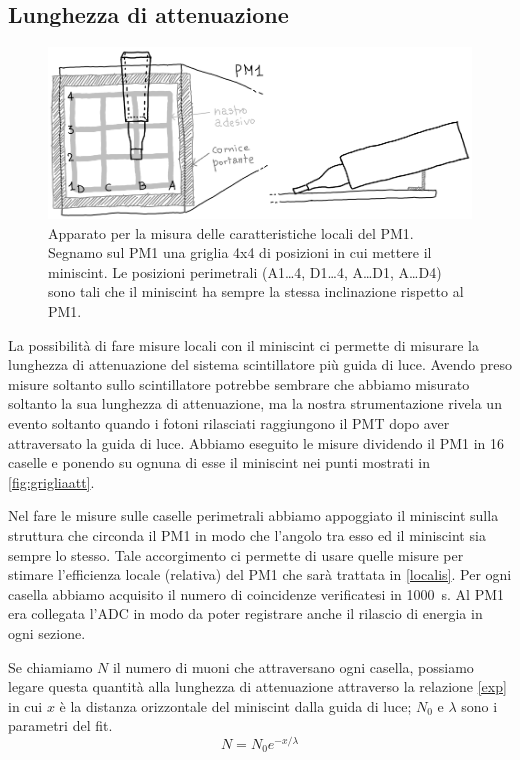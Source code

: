 \subsection{Lunghezza di attenuazione}
\label{attenu}

\begin{figure}
	\centering
	\includegraphics[width=\textwidth]{grigliaatt}
	\caption{\label{fig:grigliaatt}
	Apparato per la misura delle caratteristiche locali del PM1.
	Segnamo sul PM1 una griglia 4x4 di posizioni in cui mettere il miniscint.
	Le posizioni perimetrali (A1\dots4, D1\dots4, A\dots D1, A\dots D4)
	sono tali che il miniscint ha sempre la stessa inclinazione rispetto al PM1.}
\end{figure}

La possibilità di fare misure locali con il miniscint 
ci permette di misurare la lunghezza di attenuazione del sistema scintillatore più guida di luce. Avendo preso misure soltanto sullo scintillatore potrebbe sembrare che abbiamo misurato soltanto la sua lunghezza di attenuazione, ma la nostra strumentazione rivela un evento soltanto quando i fotoni rilasciati raggiungono il PMT dopo aver attraversato la guida di luce. 
Abbiamo eseguito le misure dividendo il PM1 in 16 caselle e ponendo su ognuna di esse il miniscint nei punti mostrati in \autoref{fig:grigliaatt}. 

Nel fare le misure sulle caselle perimetrali abbiamo appoggiato il miniscint sulla struttura che circonda il PM1 in modo che l'angolo tra esso ed il miniscint sia sempre lo stesso. Tale accorgimento ci permette di usare quelle misure per stimare l'efficienza locale (relativa) del PM1 che sarà trattata in \autoref{localis}.                            
Per ogni casella abbiamo acquisito il numero di coincidenze verificatesi in \SI{1000}{s}. Al PM1 era collegata l'ADC in modo da poter registrare anche il rilascio di energia in ogni sezione.

Se chiamiamo $N$ il numero di muoni che attraversano ogni casella, possiamo legare questa quantità alla lunghezza di attenuazione attraverso la relazione \eqref{exp} in cui $x$ è la distanza orizzontale del miniscint dalla guida di luce; $N_0$ e $\lambda$ sono i parametri del fit. 
\begin{equation}
N=N_0 e^{-x/\lambda}  \label{exp}
\end{equation}

